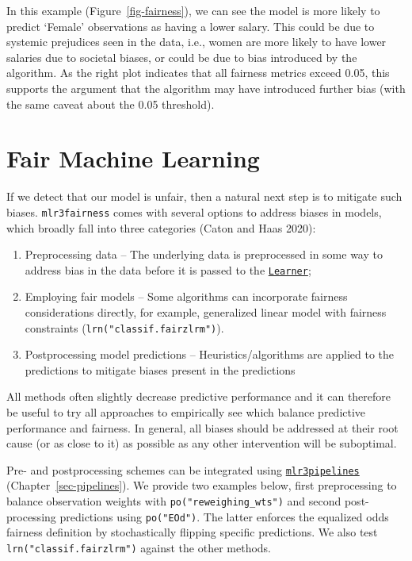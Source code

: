 In this example (Figure~\ref{fig-fairness}), we can see the model is
more likely to predict `Female' observations as having a lower salary.
This could be due to systemic prejudices seen in the data, i.e., women
are more likely to have lower salaries due to societal biases, or could
be due to bias introduced by the algorithm. As the right plot indicates
that all fairness metrics exceed 0.05, this supports the argument that
the algorithm may have introduced further bias (with the same caveat
about the 0.05 threshold).

\hypertarget{fair-machine-learning}{%
\section{Fair Machine Learning}\label{fair-machine-learning}}

If we detect that our model is unfair, then a natural next step is to
mitigate such biases. \texttt{mlr3fairness} comes with several options
to address biases in models, which broadly fall into three categories
(Caton and Haas 2020):

\begin{enumerate}
\def\labelenumi{\arabic{enumi}.}
\tightlist
\item
  Preprocessing data -- The underlying data is
  preprocessed in some way to address bias in the data before it is
  passed to the
  \href{https://mlr3.mlr-org.com/reference/Learner.html}{\texttt{Learner}};
\item
  Employing fair models -- Some algorithms can incorporate fairness
  considerations directly, for example, generalized linear model with
  fairness constraints (\texttt{lrn("classif.fairzlrm")}).
\item
  Postprocessing model predictions -- Heuristics/algorithms are applied
  to the predictions to mitigate biases present in the predictions
\end{enumerate}

All methods often slightly decrease predictive performance and it can
therefore be useful to try all approaches to empirically see which
balance predictive performance and fairness. In general, all biases
should be addressed at their root cause (or as close to it) as possible
as any other intervention will be suboptimal.

Pre- and postprocessing schemes can be integrated using
\href{https://mlr3pipelines.mlr-org.com}{\texttt{mlr3pipelines}}
(Chapter~\ref{sec-pipelines}). We provide two examples below, first
preprocessing to balance observation weights with
\texttt{po("reweighing\_wts")} and second post-processing predictions
using \texttt{po("EOd")}. The latter enforces the equalized odds
fairness definition by stochastically flipping specific predictions. We
also test \texttt{lrn("classif.fairzlrm")} against the other methods.

